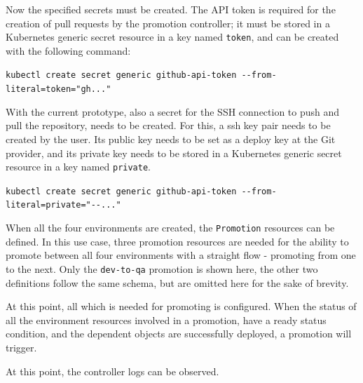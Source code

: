 Now the specified secrets must be created.
The API token is required for the creation of pull requests by the promotion controller;
it must be stored in a Kubernetes generic secret resource in a key named \lstinline|token|,
and can be created with the following command:

\lstinline|kubectl create secret generic github-api-token --from-literal=token="gh..."|

With the current prototype, also a secret for the SSH connection to push and pull
the repository, needs to be created.
For this, a ssh key pair needs to be created by the user. Its public key needs to 
be set as a deploy key at the Git provider,
and its private key needs to be stored in a
Kubernetes generic secret resource in a key named \lstinline|private|.

\lstinline|kubectl create secret generic github-api-token --from-literal=private="--..."|

When all the four environments are created, the \lstinline|Promotion| resources
can be defined.
In this use case, three promotion resources are needed for the ability to
promote between all four environments with a straight flow - promoting from one to the next.
Only the \lstinline|dev-to-qa| promotion is shown here,
the other two definitions follow the same schema,
but are omitted here for the sake of brevity.



%
%
%





At this point, all which is needed for promoting is configured.
When the status of all the environment resources involved in a promotion,
have a ready status condition,
and the dependent objects are successfully deployed,
a promotion will trigger.



At this point, the controller logs can be observed.

